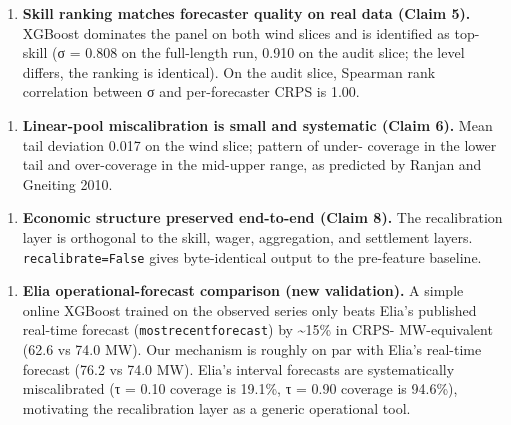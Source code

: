 \documentclass[11pt,a4paper,openany]{report}
\begin{document}
\begin{enumerate}
  \item \textbf{Skill ranking matches forecaster quality on real data (Claim 5).}
    XGBoost dominates the panel on both wind slices and is identified
    as top-skill (σ = 0.808 on the full-length run, 0.910 on the audit
    slice; the level differs, the ranking is identical). On the audit
    slice, Spearman rank correlation between σ and per-forecaster CRPS
    is 1.00.
\end{enumerate}

\begin{enumerate}
  \item \textbf{Linear-pool miscalibration is small and systematic (Claim 6).}
    Mean tail deviation 0.017 on the wind slice; pattern of under-
    coverage in the lower tail and over-coverage in the mid-upper
    range, as predicted by Ranjan and Gneiting 2010.
\end{enumerate}


\begin{enumerate}
  \item \textbf{Economic structure preserved end-to-end (Claim 8).} The
    recalibration layer is orthogonal to the skill, wager, aggregation,
    and settlement layers. \texttt{recalibrate=False} gives byte-identical
    output to the pre-feature baseline.
\end{enumerate}

\begin{enumerate}
  \item \textbf{Elia operational-forecast comparison (new validation).} A simple
    online XGBoost trained on the observed series only beats Elia's
    published real-time forecast (\texttt{mostrecentforecast}) by \textasciitilde{}15\% in CRPS-
    MW-equivalent (62.6 vs 74.0 MW). Our mechanism is roughly on par
    with Elia's real-time forecast (76.2 vs 74.0 MW). Elia's interval
    forecasts are systematically miscalibrated (τ = 0.10 coverage is
    19.1\%, τ = 0.90 coverage is 94.6\%), motivating the recalibration
    layer as a generic operational tool.
\end{enumerate}
\end{document}
